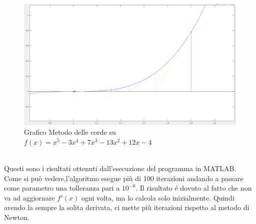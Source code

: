 \documentclass[12pt, letterpaper]{article}
\begin{document}
\begin{figure}[ht!]
    \includegraphics[scale=0.40]{MultiRadixNewton.png}
    \caption{Grafico Metodo delle corde su $f(x)=x^5-3x^4+7x^3-13x^2+12x-4$}
\end{figure} \\
Questi sono i risultati ottenuti dall'esecuzione del programma in MATLAB.\\ Come si può vedere,l'algoritmo esegue più di 100 iterazioni andando a passare come parametro una tolleranza pari a $10^{-8}$.
Il risultato \'e dovuto al fatto che non va ad aggiornare $f'(x)$ ogni volta, ma lo calcola solo inizialmente. Quindi avendo la sempre la solita derivata, ci mette più iterazioni rispetto al metodo di Newton.

\newpage
\end{document}
